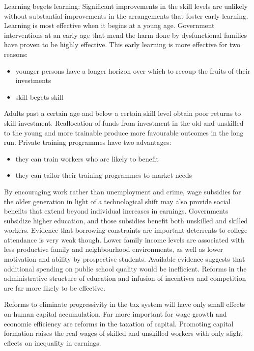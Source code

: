 \documentclass[12pt,a4paper]{article}
\begin{document}
Learning begets learning: Significant improvements in the skill levels are unlikely without substantial improvements in the arrangements that foster early learning. Learning is most effective when it begins at a young age. Government interventions at an early age that mend the harm done by dysfunctional families have proven to be highly effective. This early learning is more effective for two reasons:
        \begin{itemize}
          \item younger persons have a longer horizon over which to recoup the fruits of their investments
          \item skill begets skill
        \end{itemize}
      Adults past a certain age and below a certain skill level obtain poor returns to skill investment. Reallocation of funds from investment in the old and unskilled to the young and more trainable produce more favourable outcomes in the long run. Private training programmes have two advantages:
      \begin{itemize}
        \item they can train workers who are likely to benefit
        \item they can tailor their training programmes to market needs
      \end{itemize}
      By encouraging work rather than unemployment and crime, wage subsidies for the older generation in light of a technological shift may also provide social benefits that extend beyond individual increases in earnings. Governments subsidize higher education, and those subsidies benefit both unskilled and skilled workers. Evidence that borrowing constraints are important deterrents to college attendance is very weak though. Lower family income levels are associated with less productive family and neighbourhood environments, as well as lower motivation and ability by prospective students. Available evidence suggests that additional spending on public school quality would be inefficient. Reforms in the administrative structure of education and infusion of incentives and competition are far more likely to be effective.

      Reforms to eliminate progressivity in the tax system will have only small effects on human capital accumulation. Far more important for wage growth and economic efficiency are reforms in the taxation of capital. Promoting capital formation raises the real wages of skilled and unskilled workers with only slight effects on inequality in earnings.
\end{document}
